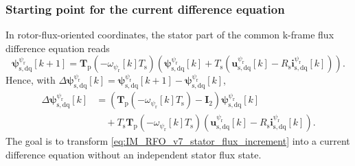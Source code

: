 \begin{frame}
    \frametitle{Starting point for the current difference equation}
    In rotor-flux-oriented coordinates, the stator part of the common $\mathrm{k}$-frame flux difference equation reads
    \begin{equation*}
        \bm{\psi}^{\psi_\mathrm{r}}_{\mathrm{s},\mathrm{dq}}[k+1]
        =\bm{T}_\mathrm{p}(-\omega_{\psi_\mathrm{r}}[k]T_\mathrm{s})\left(\bm{\psi}^{\psi_\mathrm{r}}_{\mathrm{s},\mathrm{dq}}[k]
        +T_\mathrm{s}\left(\bm{u}^{\psi_\mathrm{r}}_{\mathrm{s},\mathrm{dq}}[k]
        -R_\mathrm{s}\bm{i}^{\psi_\mathrm{r}}_{\mathrm{s},\mathrm{dq}}[k]\right)\right).
    \end{equation*}\pause%
    Hence, with $\Delta\bm{\psi}^{\psi_\mathrm{r}}_{\mathrm{s},\mathrm{dq}}[k]=\bm{\psi}^{\psi_\mathrm{r}}_{\mathrm{s},\mathrm{dq}}[k+1]-\bm{\psi}^{\psi_\mathrm{r}}_{\mathrm{s},\mathrm{dq}}[k]$,
    \begin{equation}
        \begin{split}
            \Delta\bm{\psi}^{\psi_\mathrm{r}}_{\mathrm{s},\mathrm{dq}}[k]
             & =\left(\bm{T}_\mathrm{p}(-\omega_{\psi_\mathrm{r}}[k]T_\mathrm{s})-\bm{I}_2\right)\bm{\psi}^{\psi_\mathrm{r}}_{\mathrm{s},\mathrm{dq}}[k] \\
             & \quad+T_\mathrm{s}\bm{T}_\mathrm{p}(-\omega_{\psi_\mathrm{r}}[k]T_\mathrm{s})
            \left(\bm{u}^{\psi_\mathrm{r}}_{\mathrm{s},\mathrm{dq}}[k]
            -R_\mathrm{s}\bm{i}^{\psi_\mathrm{r}}_{\mathrm{s},\mathrm{dq}}[k]\right).
        \end{split}
        \label{eq:IM_RFO_v7_stator_flux_increment}
    \end{equation}\pause%
    The goal is to transform \eqref{eq:IM_RFO_v7_stator_flux_increment} into a current difference equation without an independent stator flux state.
\end{frame}



